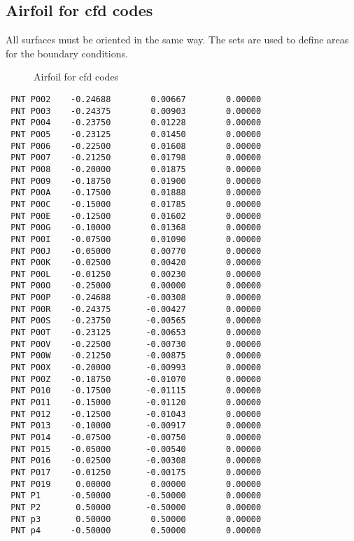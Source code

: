\documentclass{article}
\begin{document}
\begin{appendix}
\subsection{\label{Airfoil for cfd codes}Airfoil for cfd codes}
All surfaces must be oriented in the same way. The sets are used to define areas for the boundary conditions.
\begin{figure}[h]
\caption{\label{Airfoil for duns}Airfoil for cfd codes }
\end{figure}
\begin{verbatim}
 PNT P002    -0.24688        0.00667        0.00000 
 PNT P003    -0.24375        0.00903        0.00000 
 PNT P004    -0.23750        0.01228        0.00000 
 PNT P005    -0.23125        0.01450        0.00000 
 PNT P006    -0.22500        0.01608        0.00000 
 PNT P007    -0.21250        0.01798        0.00000 
 PNT P008    -0.20000        0.01875        0.00000 
 PNT P009    -0.18750        0.01900        0.00000 
 PNT P00A    -0.17500        0.01888        0.00000 
 PNT P00C    -0.15000        0.01785        0.00000 
 PNT P00E    -0.12500        0.01602        0.00000 
 PNT P00G    -0.10000        0.01368        0.00000 
 PNT P00I    -0.07500        0.01090        0.00000 
 PNT P00J    -0.05000        0.00770        0.00000 
 PNT P00K    -0.02500        0.00420        0.00000 
 PNT P00L    -0.01250        0.00230        0.00000 
 PNT P00O    -0.25000        0.00000        0.00000 
 PNT P00P    -0.24688       -0.00308        0.00000 
 PNT P00R    -0.24375       -0.00427        0.00000 
 PNT P00S    -0.23750       -0.00565        0.00000 
 PNT P00T    -0.23125       -0.00653        0.00000 
 PNT P00V    -0.22500       -0.00730        0.00000 
 PNT P00W    -0.21250       -0.00875        0.00000 
 PNT P00X    -0.20000       -0.00993        0.00000 
 PNT P00Z    -0.18750       -0.01070        0.00000 
 PNT P010    -0.17500       -0.01115        0.00000 
 PNT P011    -0.15000       -0.01120        0.00000 
 PNT P012    -0.12500       -0.01043        0.00000 
 PNT P013    -0.10000       -0.00917        0.00000 
 PNT P014    -0.07500       -0.00750        0.00000 
 PNT P015    -0.05000       -0.00540        0.00000 
 PNT P016    -0.02500       -0.00308        0.00000 
 PNT P017    -0.01250       -0.00175        0.00000 
 PNT P019     0.00000        0.00000        0.00000 
 PNT P1      -0.50000       -0.50000        0.00000 
 PNT P2       0.50000       -0.50000        0.00000 
 PNT p3       0.50000        0.50000        0.00000 
 PNT p4      -0.50000        0.50000        0.00000 

\end{verbatim}
\end{appendix}
\end{document}
